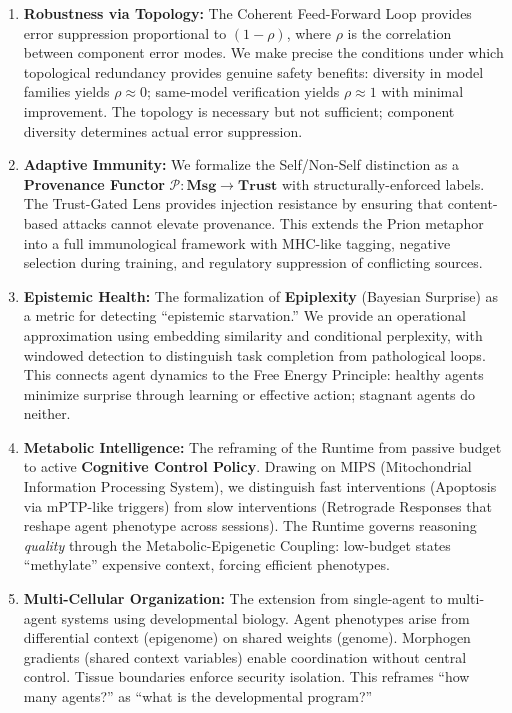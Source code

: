 \begin{enumerate}[leftmargin=*]
\item \textbf{Robustness via Topology:} The Coherent Feed-Forward Loop provides error suppression proportional
to $(1-\rho)$, where $\rho$ is the correlation between component error modes. We make precise the conditions
under which topological redundancy provides genuine safety benefits: diversity in model families yields
$\rho \approx 0$; same-model verification yields $\rho \approx 1$ with minimal improvement. The topology is
necessary but not sufficient; component diversity determines actual error suppression.

\item \textbf{Adaptive Immunity:} We formalize the Self/Non-Self distinction as a \textbf{Provenance Functor}
$\mathcal{P}: \mathbf{Msg} \to \mathbf{Trust}$ with structurally-enforced labels. The Trust-Gated Lens
provides injection resistance by ensuring that content-based attacks cannot elevate provenance. This extends
the Prion metaphor into a full immunological framework with MHC-like tagging, negative selection during
training, and regulatory suppression of conflicting sources.

\item \textbf{Epistemic Health:} The formalization of \textbf{Epiplexity} (Bayesian Surprise) as a metric for
detecting ``epistemic starvation.'' We provide an operational approximation using embedding similarity and
conditional perplexity, with windowed detection to distinguish task completion from pathological loops.
This connects agent dynamics to the Free Energy Principle: healthy agents minimize surprise through learning
or effective action; stagnant agents do neither.

\item \textbf{Metabolic Intelligence:} The reframing of the Runtime from passive budget to active
\textbf{Cognitive Control Policy}. Drawing on MIPS (Mitochondrial Information Processing System), we
distinguish fast interventions (Apoptosis via mPTP-like triggers) from slow interventions (Retrograde
Responses that reshape agent phenotype across sessions). The Runtime governs reasoning \textit{quality}
through the Metabolic-Epigenetic Coupling: low-budget states ``methylate'' expensive context, forcing
efficient phenotypes.

\item \textbf{Multi-Cellular Organization:} The extension from single-agent to multi-agent systems using
developmental biology. Agent phenotypes arise from differential context (epigenome) on shared weights (genome).
Morphogen gradients (shared context variables) enable coordination without central control. Tissue boundaries
enforce security isolation. This reframes ``how many agents?'' as ``what is the developmental program?''


\end{enumerate}
